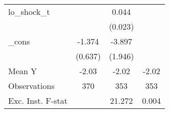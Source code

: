 {\begin{tabular}{l*{3}{c}}
\addlinespace
lo\_shock\_t  &                     &       0.044\sym{*}  &                     \\
            &                     &     (0.023)         &                     \\
\addlinespace
\_cons      &      -1.374\sym{**} &      -3.897\sym{*}  &                     \\
            &     (0.637)         &     (1.946)         &                     \\
\midrule
Mean Y      &       -2.03         &       -2.02         &       -2.02         \\
Observations&         370         &         353         &         353         \\
Exc. Inst. F-stat&                     &      21.272         &       0.004         \\
\bottomrule
\end{tabular}
}
